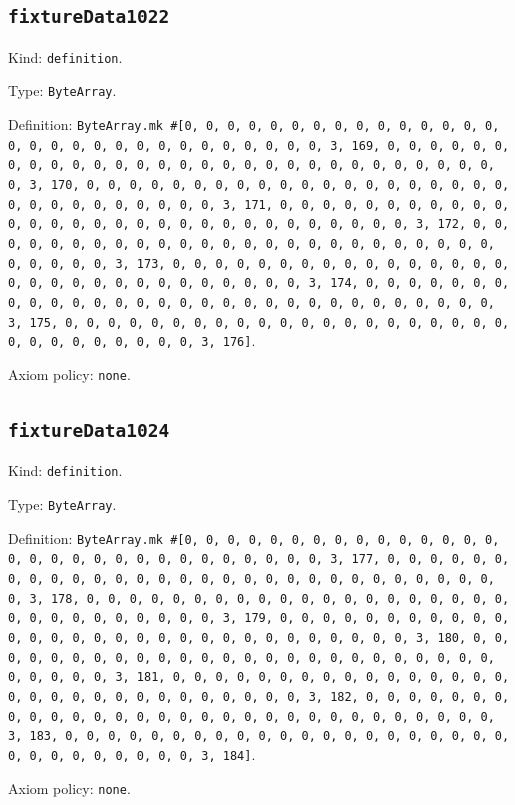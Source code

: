 \documentclass[11pt]{article}
\begin{document}
\subsection*{\texttt{fixtureData1022}}
\noindent Kind: \texttt{definition}.\par
\noindent Type: \texttt{ByteArray}.\par
\noindent Definition: \texttt{ByteArray.mk \#[0, 0, 0, 0, 0, 0, 0, 0, 0, 0, 0, 0, 0, 0, 0, 0, 0, 0, 0, 0, 0, 0, 0, 0, 0, 0, 0, 0, 0, 0, 3, 169, 0, 0, 0, 0, 0, 0, 0, 0, 0, 0, 0, 0, 0, 0, 0, 0, 0, 0, 0, 0, 0, 0, 0, 0, 0, 0, 0, 0, 0, 0, 3, 170, 0, 0, 0, 0, 0, 0, 0, 0, 0, 0, 0, 0, 0, 0, 0, 0, 0, 0, 0, 0, 0, 0, 0, 0, 0, 0, 0, 0, 0, 0, 3, 171, 0, 0, 0, 0, 0, 0, 0, 0, 0, 0, 0, 0, 0, 0, 0, 0, 0, 0, 0, 0, 0, 0, 0, 0, 0, 0, 0, 0, 0, 0, 3, 172, 0, 0, 0, 0, 0, 0, 0, 0, 0, 0, 0, 0, 0, 0, 0, 0, 0, 0, 0, 0, 0, 0, 0, 0, 0, 0, 0, 0, 0, 0, 3, 173, 0, 0, 0, 0, 0, 0, 0, 0, 0, 0, 0, 0, 0, 0, 0, 0, 0, 0, 0, 0, 0, 0, 0, 0, 0, 0, 0, 0, 0, 0, 3, 174, 0, 0, 0, 0, 0, 0, 0, 0, 0, 0, 0, 0, 0, 0, 0, 0, 0, 0, 0, 0, 0, 0, 0, 0, 0, 0, 0, 0, 0, 0, 3, 175, 0, 0, 0, 0, 0, 0, 0, 0, 0, 0, 0, 0, 0, 0, 0, 0, 0, 0, 0, 0, 0, 0, 0, 0, 0, 0, 0, 0, 0, 0, 3, 176]}.\par
\noindent Axiom policy: \texttt{none}.\par
\subsection*{\texttt{fixtureData1024}}
\noindent Kind: \texttt{definition}.\par
\noindent Type: \texttt{ByteArray}.\par
\noindent Definition: \texttt{ByteArray.mk \#[0, 0, 0, 0, 0, 0, 0, 0, 0, 0, 0, 0, 0, 0, 0, 0, 0, 0, 0, 0, 0, 0, 0, 0, 0, 0, 0, 0, 0, 0, 3, 177, 0, 0, 0, 0, 0, 0, 0, 0, 0, 0, 0, 0, 0, 0, 0, 0, 0, 0, 0, 0, 0, 0, 0, 0, 0, 0, 0, 0, 0, 0, 3, 178, 0, 0, 0, 0, 0, 0, 0, 0, 0, 0, 0, 0, 0, 0, 0, 0, 0, 0, 0, 0, 0, 0, 0, 0, 0, 0, 0, 0, 0, 0, 3, 179, 0, 0, 0, 0, 0, 0, 0, 0, 0, 0, 0, 0, 0, 0, 0, 0, 0, 0, 0, 0, 0, 0, 0, 0, 0, 0, 0, 0, 0, 0, 3, 180, 0, 0, 0, 0, 0, 0, 0, 0, 0, 0, 0, 0, 0, 0, 0, 0, 0, 0, 0, 0, 0, 0, 0, 0, 0, 0, 0, 0, 0, 0, 3, 181, 0, 0, 0, 0, 0, 0, 0, 0, 0, 0, 0, 0, 0, 0, 0, 0, 0, 0, 0, 0, 0, 0, 0, 0, 0, 0, 0, 0, 0, 0, 3, 182, 0, 0, 0, 0, 0, 0, 0, 0, 0, 0, 0, 0, 0, 0, 0, 0, 0, 0, 0, 0, 0, 0, 0, 0, 0, 0, 0, 0, 0, 0, 3, 183, 0, 0, 0, 0, 0, 0, 0, 0, 0, 0, 0, 0, 0, 0, 0, 0, 0, 0, 0, 0, 0, 0, 0, 0, 0, 0, 0, 0, 0, 0, 3, 184]}.\par
\noindent Axiom policy: \texttt{none}.\par
\end{document}
